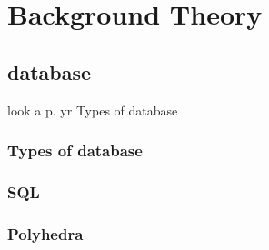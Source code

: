 \section{Background Theory}

\subsection{database}
look a p. yr
Types of database

\subsubsection{Types of database}

\subsubsection{SQL}

\subsubsection{Polyhedra }